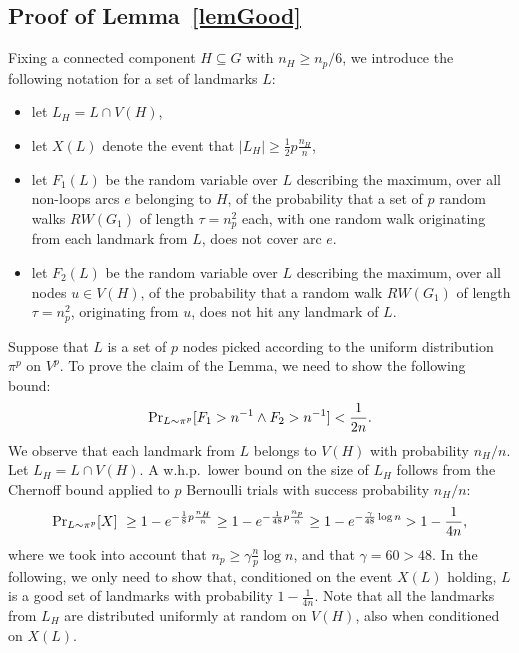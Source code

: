 \documentclass[11pt,a4paper]{article}
\renewcommand{\Pr}{\ensuremath \mathrm {Pr}}
\renewcommand{\*}{\hspace*{5mm}}
\begin{document}
\subsection*{Proof of Lemma~\ref{lemGood}}

Fixing a connected component $H \subseteq G$ with $n_H \geq n_p/6$, we introduce the following notation for a set of landmarks $L$:
\begin{itemize}
\item let $L_H = L\cap V(H)$,
\item let $X(L)$ denote the event that $|L_H| \geq \frac{1}{2} p \frac{n_H}{n}$,
\item let $F_1(L)$ be the random variable over $L$ describing the maximum, over all non-loops arcs $e$ belonging to $H$, of the probability that a set of $p$ random walks $RW(G_1)$ of length $\tau = n_p^2$ each, with one random walk originating from each landmark from $L$, does not cover arc $e$.
\item let $F_2(L)$ be the random variable over $L$ describing the maximum, over all nodes $u \in V(H)$, of the probability that a random walk $RW(G_1)$ of length $\tau = n_p^2$, originating from $u$, does not hit any landmark of $L$.
\end{itemize}
Suppose that $L$ is a set of $p$ nodes picked according to the uniform distribution $\pi^p$ on $V^p$. To prove the claim of the Lemma, we need to show the following bound:
\begin{equation}\label{eq11}
\Pr_{L\sim \pi^p} [F_1 > n^{-1} \wedge  F_2 > n^{-1}] <\frac{1}{2n}.
\end{equation}
We observe that each landmark from $L$ belongs to $V(H)$ with probability $n_H/n$. Let $L_H = L\cap V(H)$. A w.h.p.\ lower bound on the size of $L_H$ follows from the Chernoff bound applied to $p$ Bernoulli trials with success probability $n_H/n$:
\begin{equation}\label{eq12}
\Pr_{L\sim \pi^p} [ X ] \ \geq 1 - e^{-\frac{1}{8}p\frac{n_H}{n}} \geq 1 - e^{-\frac{1}{48}p\frac{n_p}{n}}\geq 1 - e^{-\frac{\gamma}{48}\log n} > 1 - \frac{1}{4n},
\end{equation}
where we took into account that $n_p \geq \gamma \frac{n}{p} \log n$, and that $\gamma=60 > 48$. In the following, we only need to show that, conditioned on the event $X(L)$ holding, $L$ is a good set of landmarks with probability $1 - \frac{1}{4n}$. Note that all the landmarks from $L_H$ are distributed uniformly at random on $V(H)$, also when conditioned on $X(L)$.
\end{document}
